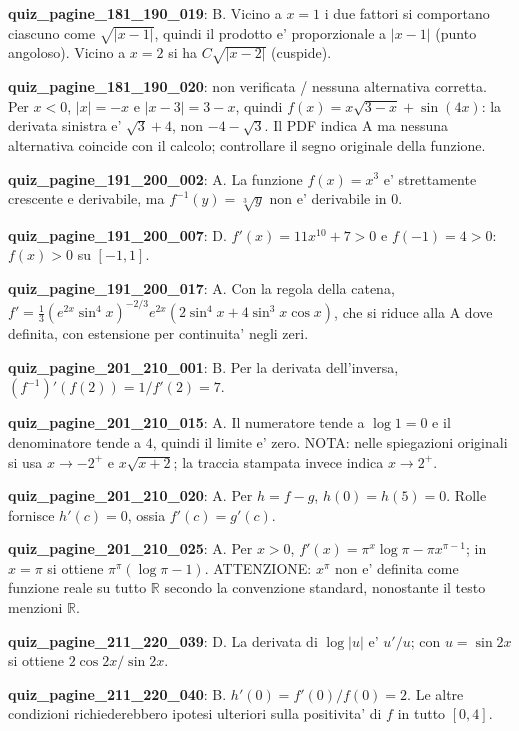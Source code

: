 \documentclass[11pt,a4paper]{article}
\newcounter{quiz}
\begin{document}
\noindent\textbf{quiz\_pagine\_181\_190\_019}: B. Vicino a $x=1$ i due fattori si comportano ciascuno come $\sqrt{|x-1|}$, quindi il prodotto e' proporzionale a $|x-1|$ (punto angoloso). Vicino a $x=2$ si ha $C\sqrt{|x-2|}$ (cuspide).\par\medskip
\noindent\textbf{quiz\_pagine\_181\_190\_020}: non verificata / nessuna alternativa corretta. Per $x<0$, $|x|=-x$ e $|x-3|=3-x$, quindi $f(x)=x\sqrt{3-x}+\sin(4x)$: la derivata sinistra e' $\sqrt3+4$, non $-4-\sqrt3$. Il PDF indica A ma nessuna alternativa coincide con il calcolo; controllare il segno originale della funzione.\par\medskip
\noindent\textbf{quiz\_pagine\_191\_200\_002}: A. La funzione $f(x)=x^3$ e' strettamente crescente e derivabile, ma $f^{-1}(y)=\sqrt[3]{y}$ non e' derivabile in $0$.\par\medskip
\noindent\textbf{quiz\_pagine\_191\_200\_007}: D. $f'(x)=11x^{10}+7>0$ e $f(-1)=4>0$: $f(x)>0$ su $[-1,1]$.\par\medskip
\noindent\textbf{quiz\_pagine\_191\_200\_017}: A. Con la regola della catena, $f'=\frac13(e^{2x}\sin^4x)^{-2/3}e^{2x}(2\sin^4x+4\sin^3x\cos x)$, che si riduce alla A dove definita, con estensione per continuita' negli zeri.\par\medskip
\noindent\textbf{quiz\_pagine\_201\_210\_001}: B. Per la derivata dell'inversa, $(f^{-1})'(f(2))=1/f'(2)=7$.\par\medskip
\noindent\textbf{quiz\_pagine\_201\_210\_015}: A. Il numeratore tende a $\log1=0$ e il denominatore tende a $4$, quindi il limite e' zero. NOTA: nelle spiegazioni originali si usa $x\to-2^+$ e $x\sqrt{x+2}$; la traccia stampata invece indica $x\to2^+$.\par\medskip
\noindent\textbf{quiz\_pagine\_201\_210\_020}: A. Per $h=f-g$, $h(0)=h(5)=0$. Rolle fornisce $h'(c)=0$, ossia $f'(c)=g'(c)$.\par\medskip
\noindent\textbf{quiz\_pagine\_201\_210\_025}: A. Per $x>0$, $f'(x)=\pi^x\log\pi-\pi x^{\pi-1}$; in $x=\pi$ si ottiene $\pi^\pi(\log\pi-1)$. ATTENZIONE: $x^\pi$ non e' definita come funzione reale su tutto $\mathbb R$ secondo la convenzione standard, nonostante il testo menzioni $\mathbb R$.\par\medskip
\noindent\textbf{quiz\_pagine\_211\_220\_039}: D. La derivata di $\log|u|$ e' $u'/u$; con $u=\sin2x$ si ottiene $2\cos2x/\sin2x$.\par\medskip
\noindent\textbf{quiz\_pagine\_211\_220\_040}: B. $h'(0)=f'(0)/f(0)=2$. Le altre condizioni richiederebbero ipotesi ulteriori sulla positivita' di $f$ in tutto $[0,4]$.\par\medskip
\end{document}
